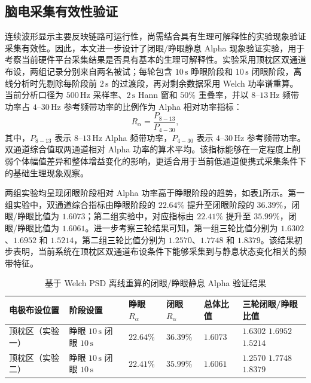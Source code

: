 \subsection{脑电采集有效性验证}

连续波形显示主要反映链路可运行性，尚需结合具有生理可解释性的实验现象验证采集有效性。因此，本文进一步设计了闭眼/睁眼静息 Alpha 现象验证实验，用于考察当前硬件平台采集结果是否具有基本的生理可解释性。实验采用顶枕区双通道布设，两组记录分别来自两名被试；每轮包含 $10\,\mathrm{s}$ 睁眼阶段和 $10\,\mathrm{s}$ 闭眼阶段，离线分析时先剔除每阶段前 $2\,\mathrm{s}$ 的过渡段，再对剩余数据采用 Welch 功率谱重算。当前分析口径为 $500\,\mathrm{Hz}$ 采样率、$2\,\mathrm{s}$ Hann 窗和 $50\%$ 重叠率，并以 $8$--$13\,\mathrm{Hz}$ 频带功率占 $4$--$30\,\mathrm{Hz}$ 参考频带功率的比例作为 Alpha 相对功率指标：
\begin{equation}
R_{\alpha}=\frac{P_{8-13}}{P_{4-30}},
\label{eq:c3_alpha_ratio}
\end{equation}
其中，$P_{8-13}$ 表示 $8$--$13\,\mathrm{Hz}$ Alpha 频带功率，$P_{4-30}$ 表示 $4$--$30\,\mathrm{Hz}$ 参考频带功率。双通道综合值取两通道相对 Alpha 功率的算术平均。该指标能够在一定程度上削弱个体幅值差异和整体增益变化的影响，更适合用于当前低通道便携式采集条件下的基础生理现象观察。

两组实验均呈现闭眼阶段相对 Alpha 功率高于睁眼阶段的趋势，如表\ref{tab:c3_alpha_validation}所示。第一组实验中，双通道综合指标由睁眼阶段的 $22.64\%$ 提升至闭眼阶段的 $36.39\%$，闭眼/睁眼比值为 $1.6073$；第二组实验中，对应指标由 $22.41\%$ 提升至 $35.99\%$，闭眼/睁眼比值为 $1.6061$。进一步考察三轮结果可知，第一组三轮比值分别为 $1.6302$、$1.6952$ 和 $1.5214$，第二组三轮比值分别为 $1.2570$、$1.7748$ 和 $1.8379$。该结果初步表明，当前系统在顶枕区双通道布设条件下能够采集到与静息状态变化相关的频带特征。

\begin{table}[htbp]
    \centering
    \caption{基于 Welch PSD 离线重算的闭眼/睁眼静息 Alpha 验证结果}
    \label{tab:c3_alpha_validation}
    \small
    \renewcommand{\arraystretch}{1.18}
    \setlength{\tabcolsep}{4pt}
    \begin{tabular}{p{2.4cm}p{1.8cm}p{1.5cm}p{1.5cm}p{1.4cm}p{2.4cm}}
        \toprule[1.5pt]
        电极布设位置 & 阶段设置 & 睁眼 $R_{\alpha}$ & 闭眼 $R_{\alpha}$ & 总体比值 & 三轮闭眼/睁眼比值 \\
        \midrule[1pt]
        顶枕区（实验一） & \makecell[c]{睁眼 $10\,\mathrm{s}$\\闭眼 $10\,\mathrm{s}$} & $22.64\%$ & $36.39\%$ & $1.6073$ & \makecell[c]{$1.6302$\\$1.6952$\\$1.5214$} \\
        顶枕区（实验二） & \makecell[c]{睁眼 $10\,\mathrm{s}$\\闭眼 $10\,\mathrm{s}$} & $22.41\%$ & $35.99\%$ & $1.6061$ & \makecell[c]{$1.2570$\\$1.7748$\\$1.8379$} \\
        \bottomrule[1.5pt]
    \end{tabular}
\end{table}

